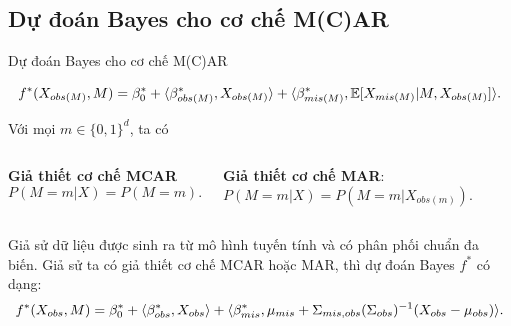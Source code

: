 \documentclass[aspectratio=169, 10pt]{beamer} %
\begin{document}
\subsection{Dự đoán Bayes cho cơ chế M(C)AR}
\begin{frame}{Dự đoán Bayes cho cơ chế M(C)AR}
    
    \[
        f^* (X_{obs(M)}, M) = \beta_{0}^{*} + \langle\beta_{obs(M)}^{*}, X_{obs(M)}\rangle 
    + \langle\beta_{mis(M)}^{*}, {\mathbb{E} [X_{mis(M)} | M, X_{obs(M)}]} \rangle.
    \]

    \pause
    Với mọi $m \in \{0, 1\}^d$, ta có
    \vspace{0.5em}
    \begin{columns}
        \textbf{Giả thiết cơ chế MCAR}
        \begin{equation*}
            P(M = m | X) = P(M = m).    
        \end{equation*}

        \textbf{Giả thiết cơ chế MAR}: 
        \begin{equation*}
            P(M = m | X) = P(M = m | X_{obs(m)}).
        \end{equation*}
    \end{columns}

    \pause

    \begin{prop}
    Giả sử dữ liệu được sinh ra từ mô hình tuyến tính và có phân phối chuẩn đa biến. Giả sử ta có giả thiết cơ chế MCAR hoặc MAR, thì dự đoán Bayes $f^*$ có dạng:
    \begin{equation*}\label{eq:mcar_bayes_predictor}
        f^* (X_{obs},M ) =
        \beta_{0}^{*} + \langle\beta_{obs}^{*},X_{obs} \rangle+\langle\beta_{mis}^{*},\mu_{mis} + \Sigma_{mis,obs}(\Sigma_{obs})^{-1}(X_{obs}-\mu_{obs})\rangle.
    \end{equation*}
\end{prop}
\end{frame}
\end{document}
